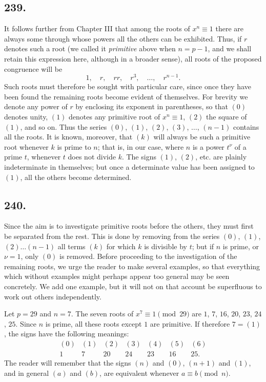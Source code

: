 \documentclass[12pt]{article}
\begin{document}
\subsection*{239.}
It follows further from Chapter III that among the roots of $x^n\equiv 1$ there are always some through whose powers all the others can be exhibited. Thus, if $r$ denotes such a root (we called it \textit{primitive} above when $n=p-1$, and we shall retain this expression here, although in a broader sense), all roots of the proposed congruence will be
\[
1,\quad r,\quad rr,\quad r^3,\quad \ldots,\quad r^{n-1}.
\]
Such roots must therefore be sought with particular care, since once they have been found the remaining roots become evident of themselves. For brevity we denote any power of $r$ by enclosing its exponent in parentheses, so that $(0)$ denotes unity, $(1)$ denotes any primitive root of $x^n\equiv 1$, $(2)$ the square of $(1)$, and so on. Thus the series $(0)$, $(1)$, $(2)$, $(3)$, $\ldots$, $(n-1)$ contains all the roots. It is known, moreover, that $(k)$ will always be such a primitive root whenever $k$ is prime to $n$; that is, in our case, where $n$ is a power $t^\nu$ of a prime $t$, whenever $t$ does not divide $k$. The signs $(1)$, $(2)$, etc. are plainly indeterminate in themselves; but once a determinate value has been assigned to $(1)$, all the others become determined.

\subsection*{240.}
Since the aim is to investigate primitive roots before the others, they must first be separated from the rest. This is done by removing from the series $(0)$, $(1)$, $(2)\ldots(n-1)$ all terms $(k)$ for which $k$ is divisible by $t$; but if $n$ is prime, or $\nu=1$, only $(0)$ is removed. Before proceeding to the investigation of the remaining roots, we urge the reader to make several examples, so that everything which without examples might perhaps appear too general may be seen concretely. We add one example, but it will not on that account be superfluous to work out others independently.

Let $p=29$ and $n=7$. The seven roots of $x^7\equiv 1\pmod {29}$ are $1$, $7$, $16$, $20$, $23$, $24$, $25$. Since $n$ is prime, all these roots except $1$ are primitive. If therefore $7=(1)$, the signs have the following meanings:
\[
\begin{array}{ccccccc}
(0)&(1)&(2)&(3)&(4)&(5)&(6)\\
1&7&20&24&23&16&25.
\end{array}
\]
The reader will remember that the signs $(n)$ and $(0)$, $(n+1)$ and $(1)$, and in general $(a)$ and $(b)$, are equivalent whenever $a\equiv b\pmod n$.
\end{document}
